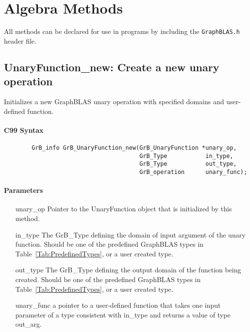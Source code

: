 \section{Algebra Methods}
\label{Sec:AlgebraMethods}

All methods can be declared for use in programs by including the {\tt GraphBLAS.h} header file.


\subsection{{\sf UnaryFunction\_new}: Create a new unary operation}

Initializes a new GraphBLAS unary operation with specified domains and user-defined function.


\paragraph{C99 Syntax}

\begin{verbatim}
        GrB_info GrB_UnaryFunction_new(GrB_UnaryFunction *unary_op,
                                       GrB_Type           in_type,
                                       GrB_Type           out_type,
                                       GrB_operation      unary_func);
\end{verbatim}

\paragraph{Parameters}

\begin{itemize}[leftmargin=1.1in]
    \item[{\sf unary\_op}]      Pointer to the UnaryFunction object that is initialized by 
    this method.
    \item[{\sf in\_type}]        The {\sf GrB\_Type} defining the domain of input argument of
    the unary function. Should be one of the predefined
    GraphBLAS types in Table~\ref{Tab:PredefinedTypes}, or a user created type.
    \item[{\sf out\_type}]       The {\sf GrB\_Type} defining the output domain of the function
    being created.  Should be one of the predefined
    GraphBLAS types in Table~\ref{Tab:PredefinedTypes}, or a user created type.
    \item[{\sf unary\_func}]     a pointer to a user-defined function that takes one input 
    parameter of a type consistent with {\sf in\_type} and returns a value of type {\sf out\_arg}.
\end{itemize}


